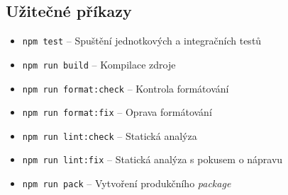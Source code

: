 \subsection*{Užitečné příkazy}

\begin{itemize}
    \item \texttt{npm test} – Spuštění jednotkových a integračních testů
    \item \texttt{npm run build} – Kompilace zdroje
    \item \texttt{npm run format:check} – Kontrola formátování
    \item \texttt{npm run format:fix} – Oprava formátování
    \item \texttt{npm run lint:check} – Statická analýza
    \item \texttt{npm run lint:fix} – Statická analýza s pokusem o nápravu
    \item \texttt{npm run pack} – Vytvoření produkčního \textit{package}
\end{itemize}
